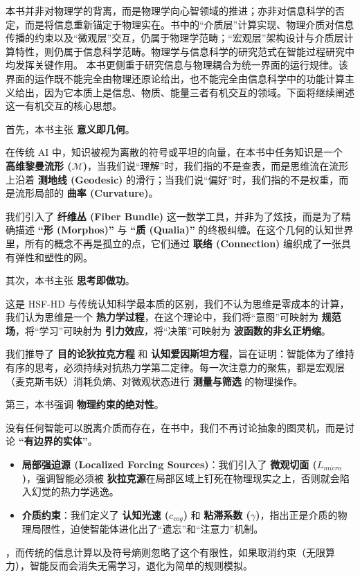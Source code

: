 本书并非对物理学的背离，而是物理学向心智领域的推进；亦非对信息科学的否定，而是将信息重新锚定于物理实在。书中的“介质层”计算实现、物理介质对信息传播的约束以及“微观层”交互，仍属于物理学范畴；“宏观层”架构设计与介质层计算特性，则仍属于信息科学范畴。物理学与信息科学的研究范式在智能过程研究中均发挥关键作用。
本书更侧重于研究信息与物理耦合为统一界面的运行规律。该界面的运作既不能完全由物理还原论给出，也不能完全由信息科学中的功能计算主义给出，因为它本质上是信息、物质、能量三者有机交互的领域。下面将继续阐述这一有机交互的核心思想。


首先，本书主张 \textbf{意义即几何}。

在传统 AI 中，知识被视为离散的符号或平坦的向量，在本书中任务知识是一个 \textbf{高维黎曼流形 ($\mathcal{M}$)}，当我们说“理解”时，我们指的不是查表，而是思维流在流形上沿着 \textbf{测地线 (Geodesic)} 的滑行；当我们说“偏好”时，我们指的不是权重，而是流形局部的 \textbf{曲率 (Curvature)}。

我们引入了 \textbf{纤维丛 (Fiber Bundle)} 这一数学工具，并非为了炫技，而是为了精确描述 \textbf{“形 (Morphos)”} 与 \textbf{“质 (Qualia)”} 的终极纠缠。在这个几何的认知世界里，所有的概念不再是孤立的点，它们通过 \textbf{联络 (Connection)} 编织成了一张具有弹性和塑性的网。


其次，本书主张 \textbf{思考即做功}。

这是 HSF-HD 与传统认知科学最本质的区别，我们不认为思维是零成本的计算，我们认为思维是一个 \textbf{热力学过程}，在这个理论中，我们将“意图”可映射为 \textbf{规范场}，将“学习”可映射为 \textbf{引力效应}，将“决策”可映射为 \textbf{波函数的非幺正坍缩}。

我们推导了 \textbf{目的论狄拉克方程} 和 \textbf{认知爱因斯坦方程}，旨在证明：智能体为了维持有序的思考，必须持续对抗热力学第二定律。每一次注意力的聚焦，都是宏观层（麦克斯韦妖）消耗负熵、对微观状态进行 \textbf{测量与筛选} 的物理操作。


第三，本书强调 \textbf{物理约束的绝对性}。

没有任何智能可以脱离介质而存在，在书中，我们不再讨论抽象的图灵机，而是讨论 \textbf{“有边界的实体”}。
\begin{itemize}
    \item \textbf{局部强迫源 (Localized Forcing Sources)}：我们引入了 \textbf{微观切面 ($L_{micro}$)}，强调智能必须被 \textbf{狄拉克源}在局部区域上钉死在物理现实之上，否则就会陷入幻觉的热力学逃逸。
    \item \textbf{介质约束}：我们定义了 \textbf{认知光速 ($c_{cog}$)} 和 \textbf{粘滞系数 ($\gamma$)}，指出正是介质的物理局限性，迫使智能体进化出了“遗忘”和“注意力”机制。
\end{itemize}
，而传统的信息计算以及符号熵则忽略了这个有限性，如果取消约束（无限算力），智能反而会消失无需学习，退化为简单的规则模拟。

